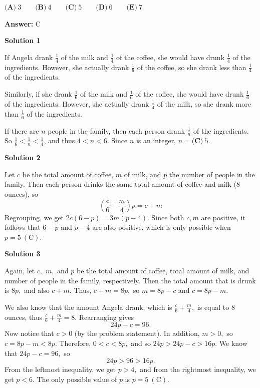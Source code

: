 \begin{enumerate}
 $\textbf {(A)}\ 3 \qquad \textbf {(B)}\ 4 \qquad \textbf {(C)}\ 5 \qquad \textbf {(D)}\ 6 \qquad \textbf {(E)}\ 7$

 \textbf{Answer: }C



\textbf{Solution 1}

If Angela drank $\frac{1}{4}$ of the milk and $\frac{1}{4}$ of the coffee, she would have drunk $\frac{1}{4}$ of the ingredients.  However, she actually drank $\frac{1}{6}$ of the coffee, so she drank less than $\frac{1}{4}$ of the ingredients.

 Similarly, if she drank $\frac{1}{6}$ of the milk and $\frac{1}{6}$ of the coffee, she would have drunk $\frac{1}{6}$ of the ingredients.  However, she actually drank $\frac{1}{4}$ of the milk, so she drank more than $\frac{1}{6}$ of the ingredients.

 If there are $n$ people in the family, then each person drank $\frac{1}{n}$ of the ingredients.  So $\frac{1}{6} < \frac{1}{n} < \frac{1}{4}$, and thus $4 < n < 6$.  Since $n$ is an integer, $n = \boxed{\textbf{(C)}\ 5}$.

 



\textbf{Solution 2}

Let $c$ be the total amount of coffee, $m$ of milk, and $p$ the number of people in the family. Then each person drinks the same total amount of coffee and milk (8 ounces), so 
 \[\left(\frac{c}{6} + \frac{m}{4}\right)p = c + m\]Regrouping, we get $2c(6-p)=3m(p-4)$. Since both $c,m$ are positive, it follows that $6-p$ and $p-4$ are also positive, which is only possible when $p = 5\ \mathrm{(C)}$.

 



\textbf{Solution 3}

Again, let $c,$ $m,$ and $p$ be the total amount of coffee, total amount of milk, and number of people in the family, respectively. Then the total amount that is drunk is $8p,$ and also $c+m.$ Thus, $c+m = 8p,$ so $m = 8p-c$ and $c = 8p-m.$

 We also know that the amount Angela drank, which is $\frac{c}{6} + \frac{m}{4},$ is equal to $8$ ounces, thus $\frac{c}{6} + \frac{m}{4} = 8.$ Rearranging gives  
 \[24p - c = 96.\] Now notice that $c > 0$ (by the problem statement). In addition, $m > 0,$ so $c = 8p-m < 8p.$ Therefore, $0 < c < 8p,$ and so $24p > 24p-c > 16p.$ We know that $24p-c = 96,$ so 
 \[24p > 96 > 16p.\] From the leftmost inequality, we get $p > 4,$ and from the rightmost inequality, we get $p < 6.$ The only possible value of $p$ is $p = 5\ \mathrm{(C)}$.


\end{enumerate}
